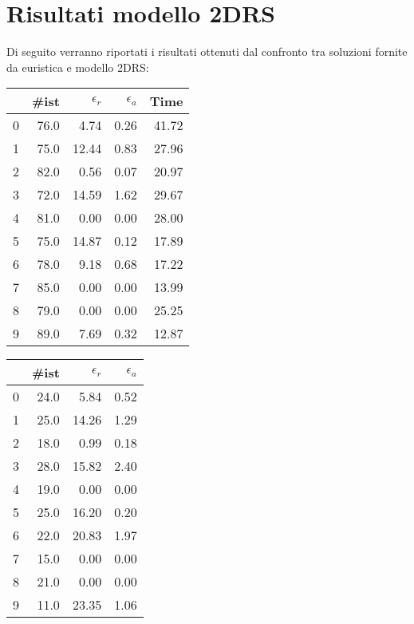 \section{Risultati modello 2DRS}
Di seguito verranno riportati i risultati ottenuti dal confronto tra soluzioni fornite da euristica e modello 2DRS:
\begin{center}
	\begin{table}[H]
		\begin{minipage}{0.45\textwidth}
			\centering
			\begin{tabular}{lrrrr}
				\toprule
				{} & \#ist & $\epsilon_r$ & $\epsilon_a$ & Time  \\
				\midrule
				0  & 76.0  & 4.74         & 0.26         & 41.72 \\
				1  & 75.0  & 12.44        & 0.83         & 27.96 \\
				2  & 82.0  & 0.56         & 0.07         & 20.97 \\
				3  & 72.0  & 14.59        & 1.62         & 29.67 \\
				4  & 81.0  & 0.00         & 0.00         & 28.00 \\
				5  & 75.0  & 14.87        & 0.12         & 17.89 \\
				6  & 78.0  & 9.18         & 0.68         & 17.22 \\
				7  & 85.0  & 0.00         & 0.00         & 13.99 \\
				8  & 79.0  & 0.00         & 0.00         & 25.25 \\
				9  & 89.0  & 7.69         & 0.32         & 12.87 \\
				\bottomrule
			\end{tabular}
		\end{minipage}
		\begin{minipage}{0.5\textwidth}
			\centering
			\begin{tabular}{lrrr}
				\toprule
				{} & \#ist & $\epsilon_r$ & $\epsilon_a$ \\
				\midrule
				0  & 24.0  & 5.84         & 0.52         \\
				1  & 25.0  & 14.26        & 1.29         \\
				2  & 18.0  & 0.99         & 0.18         \\
				3  & 28.0  & 15.82        & 2.40         \\
				4  & 19.0  & 0.00         & 0.00         \\
				5  & 25.0  & 16.20        & 0.20         \\
				6  & 22.0  & 20.83        & 1.97         \\
				7  & 15.0  & 0.00         & 0.00         \\
				8  & 21.0  & 0.00         & 0.00         \\
				9  & 11.0  & 23.35        & 1.06         \\
				\bottomrule
			\end{tabular}
		\end{minipage}
	\end{table}
\end{center}
